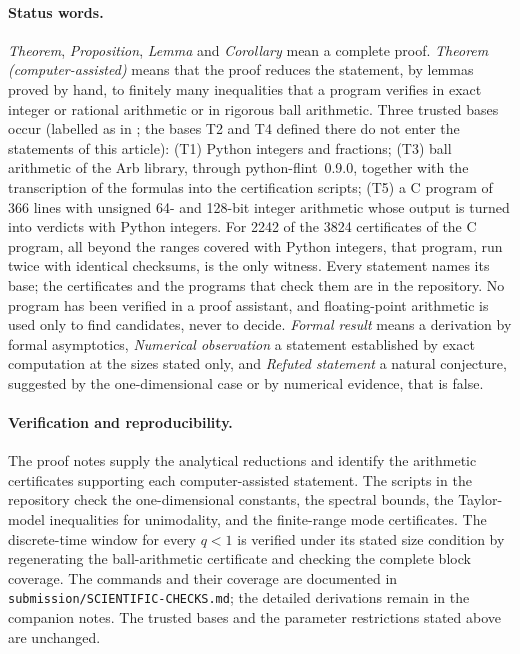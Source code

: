 \paragraph{Status words.} \emph{Theorem}, \emph{Proposition}, \emph{Lemma} and \emph{Corollary} mean a complete proof.
\emph{Theorem (computer-assisted)} means that the proof reduces the statement, by lemmas proved by hand, to finitely many
inequalities that a program verifies in exact integer or rational arithmetic or in rigorous ball arithmetic. Three
trusted bases occur (labelled as in ; the bases T2 and T4 defined there do not enter the statements
of this article): (T1) Python integers and fractions; (T3) ball arithmetic of the Arb library, through
python-flint~0.9.0, together with the transcription of the formulas into the certification scripts; (T5) a C program of
366 lines with unsigned 64- and 128-bit integer arithmetic whose output is turned into verdicts with Python integers.
For 2242 of the 3824 certificates of the C program, all beyond the ranges covered with Python integers, that program,
run twice with identical checksums, is the only witness.
Every statement names its base; the certificates and the programs that check them are in the repository. No program
has been verified in a proof assistant, and floating-point arithmetic is used only to find candidates, never to decide.
\emph{Formal result} means a derivation by formal asymptotics, \emph{Numerical observation} a statement established by
exact computation at the sizes stated only, and \emph{Refuted statement} a natural conjecture, suggested by the
one-dimensional case or by numerical evidence, that is false.

\paragraph{Verification and reproducibility.} The proof notes supply the analytical reductions and identify the arithmetic certificates supporting each computer-assisted statement. The scripts in the repository check the one-dimensional constants, the spectral bounds, the Taylor-model inequalities for unimodality, and the finite-range mode certificates. The discrete-time window for every $q<1$ is verified under its stated size condition by regenerating the ball-arithmetic certificate and checking the complete block coverage. The commands and their coverage are documented in \texttt{submission/SCIENTIFIC-CHECKS.md}; the detailed derivations remain in the companion notes. The trusted bases and the parameter restrictions stated above are unchanged.

